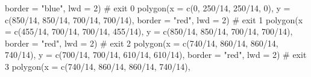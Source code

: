\documentclass[
  letterpaper,
  DIV=11,
  numbers=noendperiod]{scrreprt}
\newenvironment{Shaded}{\begin{snugshade}}{\end{snugshade}}
\newcommand{\AttributeTok}[1]{\textcolor[rgb]{0.40,0.45,0.13}{#1}}
\newcommand{\CommentTok}[1]{\textcolor[rgb]{0.37,0.37,0.37}{#1}}
\newcommand{\DecValTok}[1]{\textcolor[rgb]{0.68,0.00,0.00}{#1}}
\newcommand{\FunctionTok}[1]{\textcolor[rgb]{0.28,0.35,0.67}{#1}}
\newcommand{\NormalTok}[1]{\textcolor[rgb]{0.00,0.23,0.31}{#1}}
\newcommand{\SpecialCharTok}[1]{\textcolor[rgb]{0.37,0.37,0.37}{#1}}
\newcommand{\StringTok}[1]{\textcolor[rgb]{0.13,0.47,0.30}{#1}}
\begin{document}
\begin{Shaded}
\begin{Highlighting}[]
          \AttributeTok{border =} \StringTok{"blue"}\NormalTok{,}
          \AttributeTok{lwd =} \DecValTok{2}\NormalTok{) }\CommentTok{\# exit 0}
  \FunctionTok{polygon}\NormalTok{(}\AttributeTok{x =} \FunctionTok{c}\NormalTok{(}\DecValTok{0}\NormalTok{, }\DecValTok{250}\SpecialCharTok{/}\DecValTok{14}\NormalTok{, }\DecValTok{250}\SpecialCharTok{/}\DecValTok{14}\NormalTok{, }\DecValTok{0}\NormalTok{),}
          \AttributeTok{y =} \FunctionTok{c}\NormalTok{(}\DecValTok{850}\SpecialCharTok{/}\DecValTok{14}\NormalTok{, }\DecValTok{850}\SpecialCharTok{/}\DecValTok{14}\NormalTok{, }\DecValTok{700}\SpecialCharTok{/}\DecValTok{14}\NormalTok{, }\DecValTok{700}\SpecialCharTok{/}\DecValTok{14}\NormalTok{),}
          \AttributeTok{border =} \StringTok{"red"}\NormalTok{,}
          \AttributeTok{lwd =} \DecValTok{2}\NormalTok{) }\CommentTok{\# exit 1}
  \FunctionTok{polygon}\NormalTok{(}\AttributeTok{x =} \FunctionTok{c}\NormalTok{(}\DecValTok{455}\SpecialCharTok{/}\DecValTok{14}\NormalTok{, }\DecValTok{700}\SpecialCharTok{/}\DecValTok{14}\NormalTok{, }\DecValTok{700}\SpecialCharTok{/}\DecValTok{14}\NormalTok{, }\DecValTok{455}\SpecialCharTok{/}\DecValTok{14}\NormalTok{),}
          \AttributeTok{y =} \FunctionTok{c}\NormalTok{(}\DecValTok{850}\SpecialCharTok{/}\DecValTok{14}\NormalTok{, }\DecValTok{850}\SpecialCharTok{/}\DecValTok{14}\NormalTok{, }\DecValTok{700}\SpecialCharTok{/}\DecValTok{14}\NormalTok{, }\DecValTok{700}\SpecialCharTok{/}\DecValTok{14}\NormalTok{),}
          \AttributeTok{border =} \StringTok{"red"}\NormalTok{,}
          \AttributeTok{lwd =} \DecValTok{2}\NormalTok{) }\CommentTok{\# exit 2}
  \FunctionTok{polygon}\NormalTok{(}\AttributeTok{x =} \FunctionTok{c}\NormalTok{(}\DecValTok{740}\SpecialCharTok{/}\DecValTok{14}\NormalTok{, }\DecValTok{860}\SpecialCharTok{/}\DecValTok{14}\NormalTok{, }\DecValTok{860}\SpecialCharTok{/}\DecValTok{14}\NormalTok{, }\DecValTok{740}\SpecialCharTok{/}\DecValTok{14}\NormalTok{),}
          \AttributeTok{y =} \FunctionTok{c}\NormalTok{(}\DecValTok{700}\SpecialCharTok{/}\DecValTok{14}\NormalTok{, }\DecValTok{700}\SpecialCharTok{/}\DecValTok{14}\NormalTok{, }\DecValTok{610}\SpecialCharTok{/}\DecValTok{14}\NormalTok{, }\DecValTok{610}\SpecialCharTok{/}\DecValTok{14}\NormalTok{),}
          \AttributeTok{border =} \StringTok{"red"}\NormalTok{,}
          \AttributeTok{lwd =} \DecValTok{2}\NormalTok{) }\CommentTok{\# exit 3}
  \FunctionTok{polygon}\NormalTok{(}\AttributeTok{x =} \FunctionTok{c}\NormalTok{(}\DecValTok{740}\SpecialCharTok{/}\DecValTok{14}\NormalTok{, }\DecValTok{860}\SpecialCharTok{/}\DecValTok{14}\NormalTok{, }\DecValTok{860}\SpecialCharTok{/}\DecValTok{14}\NormalTok{, }\DecValTok{740}\SpecialCharTok{/}\DecValTok{14}\NormalTok{),}

\end{Highlighting}
\end{Shaded}
\end{document}
